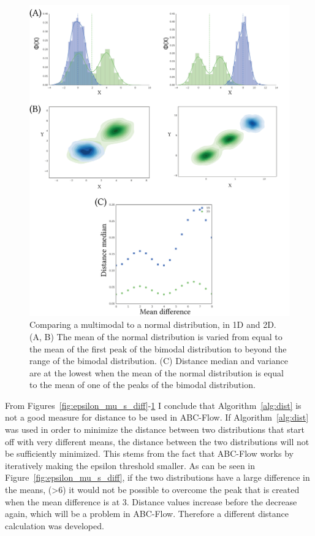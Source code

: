 \begin{figure}[tb]
\centering
\includegraphics[scale=0.7]{../../chapters/chapterABCFlow/images/multimodal_v_normal.png}
\caption[Distance value ranges of bimodal and uniform distributions using the kernel distance]{Comparing a multimodal to a normal distribution, in 1D and 2D. (A, B) The mean of the normal distribution is varied from equal to the mean of the first peak of the bimodal distribution to beyond the range of the bimodal distribution. (C) Distance median and variance are at the lowest when the mean of the normal distribution is equal to the mean of one of the peaks of the bimodal distribution. }
\label{fig:multimodal_v_normal}
\end{figure}



From Figures~\ref{fig:epsilon_mu_s_diff}-\ref{fig:multimodal_v_normal} I conclude that Algorithm~\ref{alg:dist} is not a good measure for distance to be used in ABC-Flow. If Algorithm~\ref{alg:dist} was used in order to minimize the distance between two distributions that start off with very different means, the distance between the two distributions will not be sufficiently minimized. This stems from the fact that ABC-Flow works by iteratively making the epsilon threshold smaller. As can be seen in Figure~\ref{fig:epsilon_mu_s_diff}, if the two distributions have a large difference in the means, (>6) it would not be possible to overcome the peak that is created when the mean difference is at 3. Distance values increase before the decrease again, which will be a problem in ABC-Flow. Therefore a different distance calculation was developed.   
